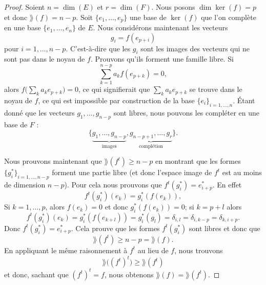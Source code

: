 \begin{proof}
    Soient \( n=\dim(E)\) et \( r=\dim(F)\).
    Nous posons \( \dim\ker(f)=p\) et donc \( \rang(f)=n-p\). Soit \( \{ e_1,\ldots, e_p \}\) une base de \( \ker(f)\) que l'on complète en une base \( \{ e_1,\ldots, e_n \}\) de \( E\). Nous considérons maintenant les vecteurs
    \begin{equation}
        g_i=f(e_{p+i})
    \end{equation}
    pour \( i=1,\ldots, n-p\). C'est-à-dire que les \( g_i\) sont les images des vecteurs qui ne sont pas dans le noyau de \( f\). Prouvons qu'ils forment une famille libre. Si
    \begin{equation}
        \sum_{k=1}^{n-p}a_kf(e_{p+k})=0,
    \end{equation}
    alors \( f\big( \sum_ka_ke_{p+k} \big)=0\), ce qui signifierait que \( \sum_ka_ke_{p+k}\) se trouve dans le noyau de \( f\), ce qui est impossible par construction de la base \( \{ e_i \}_{i=1,\ldots, n}\). Étant donné que les vecteurs \( g_1,\ldots, g_{n-p}\) sont libres, nous pouvons les compléter en une base de \( F\) :
    \begin{equation}
        \{ \underbrace{g_1,\ldots, g_{n-p}}_{\text{images}},\underbrace{g_{n-p+1},\ldots, g_r}_{\text{complétion}} \}.
    \end{equation}

    Nous prouvons maintenant que \( \rang(f^t)\geq n-p\) en montrant que les formes \( \{ g_i^* \}_{i=1,\ldots, n-p}\) forment une partie libre (et donc l'espace image de \( f^t\) est au moins de dimension \( n-p\)). Pour cela nous prouvons que \( f^t(g_i^*)=e^*_{i+p}\). En effet
    \begin{equation}
        f^t(g^*_i)(e_k)=g_i^*(f(e_k)),
    \end{equation}
    Si \( k=1,\ldots, p\), alors \( f(e_k)=0\) et donc \( g_i^*(f(e_k))=0\); si \( k=p+l\) alors
    \begin{equation}
        f^t(g_i^*)(e_k)=g_i^*(f(e_{k+l}))=g^*_i(g_l)=\delta_{i,l}=\delta_{i,k-p}=\delta_{k,i+p}.
    \end{equation}
    Donc \( f^t(g_i^*)=e^*_{i+p}\). Cela prouve que les formes \( f^t(g_i^*)\) sont libres et donc que
    \begin{equation}
        \rang(f^t)\geq n-p=\rang(f).
    \end{equation}
    En appliquant le même raisonnement à \( f^t\) au lieu de \( f\), nous trouvons
    \begin{equation}
        \rang\big( (f^t)^t \big)\geq \rang(f^t)
    \end{equation}
    et donc, sachant que \( (f^t)^t=f\), nous obtenons \( \rang(f)=\rang(f^t)\).

\end{proof}

